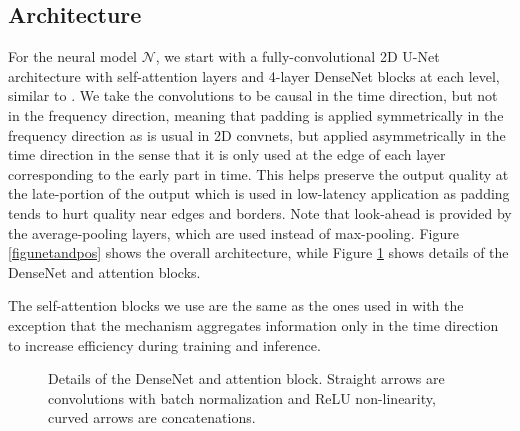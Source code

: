 \documentclass[english]{article}
\begin{document}
\begin{figure*}[h]

\begin{center}
\end{center}



\caption{Top two levels of the U-Net architecture shown with frequency-positional embeddings and STFT  real and imaginary parts inputs; and real and imaginary parts of complex ratio mask outputs. We use a 6-level U-Net architecture.}
\label{figunetandpos}
\end{figure*}

\subsection{Architecture} For the neural model $\mathcal{N}$, we start with a fully-convolutional 2D U-Net architecture with self-attention layers and 4-layer DenseNet blocks at each level, similar to \cite{tolooshams19}. We take the convolutions to be causal in the time direction, but not in the frequency direction, meaning that padding is applied symmetrically in the frequency direction as is usual in 2D convnets, but applied asymmetrically in the time direction in the sense that it is only used at the edge of each layer corresponding to the early part in time. This helps preserve the output quality at the late-portion of the output which is used in low-latency application as padding tends to hurt quality near edges and borders. Note that look-ahead is provided by the average-pooling layers, which are used instead of max-pooling. Figure \ref{figunetandpos} shows the overall architecture, while Figure \ref{figdenseattention} shows details of the DenseNet and attention blocks. 

The self-attention blocks we use are the same as the ones used in \cite{wang2018non, zhang2018self} with the exception that the mechanism aggregates information only in the time direction to increase efficiency during training and inference. 

\begin{figure}
    \caption{Details of the DenseNet and attention block. Straight arrows are convolutions with batch normalization and ReLU non-linearity, curved arrows are concatenations. }
\label{figdenseattention}
\vspace{-0.15in}
\end{figure}
\end{document}
